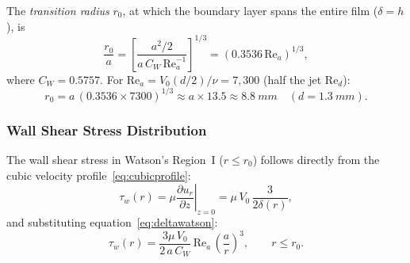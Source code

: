 \documentclass[aps,prfluids,reprint,amsmath,amssymb,floatfix]{revtex4-2}
\newcommand{\Rey}{\mathrm{Re}}
\begin{document}
The \emph{transition radius} $r_0$, at which the boundary layer spans the
entire film ($\delta = h$), is
\begin{equation}
    \frac{r_0}{a} = \left[\frac{a^2/2}{a\,C_W\,\Rey_a^{-1}}\right]^{1/3}
    = (0.3536\,\Rey_a)^{1/3},
    \label{eq:r0}
\end{equation}
where $C_W = 0.5757$. For $\Rey_a = V_0(d/2)/\nu = 7{,}300$ (half the jet
$\Rey_d$):
\begin{equation}
    r_0 = a\,(0.3536 \times 7300)^{1/3} \approx a \times 13.5 \approx
    \SI{8.8}{mm} \quad (d = \SI{1.3}{mm}).
\end{equation}

\subsubsection{Wall Shear Stress Distribution}

The wall shear stress in Watson's Region~I ($r \leq r_0$) follows directly
from the cubic velocity profile~\eqref{eq:cubicprofile}:
\begin{equation}
    \tau_w(r) = \mu\left.\frac{\partial u_r}{\partial z}\right|_{z=0}
    = \mu\,V_0\,\frac{3}{2\delta(r)},
    \label{eq:taudef}
\end{equation}
and substituting equation~\eqref{eq:deltawatson}:
\begin{equation}
    \boxed{
    \tau_w(r) = \frac{3\mu\,V_0}{2\,a\,C_W}\,
    \Rey_a\,\left(\frac{a}{r}\right)^3,
    \qquad r \leq r_0.
    }
    \label{eq:tauI}
\end{equation}
\end{document}
